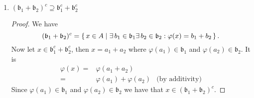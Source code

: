 \begin{exr}
\begin{enumerate}
\begin{proof}
            I think the above proof should work into both directions. If not, just notice that \(\mathfrak{a}_1^e \subset (\mathfrak{a}_1 + \mathfrak{a}_2)^e\).
          \end{proof}
          \item \((\mathfrak{b}_1 + \mathfrak{b}_2)^c \supseteq \mathfrak{b}_1^c + \mathfrak{b}_2^c\)
          \begin{proof}
            We have
            \begin{equation}
              (\mathfrak{b}_1 + \mathfrak{b}_2)^c = \left\{\, x \in A \mathrel{\mid} \exists \, b_1 \in \mathfrak{b}_1 \exists \, b_2 \in \mathfrak{b}_2 : \varphi(x) = b_1 + b_2 \,\right\} \text{.}
            \end{equation}
            Now let \(x \in \mathfrak{b}_1^c + \mathfrak{b}_2^c\), then \(x = a_1 + a_2\) where \(\varphi(a_1) \in \mathfrak{b}_1\) and \(\varphi(a_2) \in \mathfrak{b}_2\). It is
            \begin{align}
              \varphi(x) =& \varphi(a_1 + a_2) & \\
              =& \varphi(a_1) + \varphi(a_2) & \text{(by additivity)}
            \end{align}
            Since \(\varphi(a_1) \in \mathfrak{b}_1\) and \(\varphi(a_2) \in \mathfrak{b}_2\) we have that \(x \in (\mathfrak{b}_1 + \mathfrak{b}_2)^c\).
          \end{proof}
    \end{enumerate}
\end{exr}
